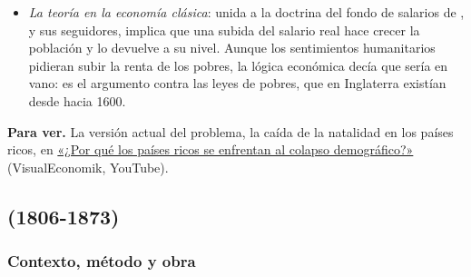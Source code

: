 \documentclass[11pt]{article}
\begin{document}
\begin{anotaciones}
\begin{itemize}
\begin{itemize}
  \item El método pasa de ser casi solo deductivo a ser también inductivo, con datos estadísticos.
  \item Cambian las conclusiones: entra la contención moral, un freno que debilita su argumento contra los utópicos, aunque ya no se preocupa de refutarlos. Desde entonces el \emph{Ensayo} apenas cambia en las ediciones siguientes.
  \end{itemize}
\item \emph{La teoría en la economía clásica}: unida a la doctrina del fondo de salarios de ,  y sus seguidores, implica que una subida del salario real hace crecer la población y lo devuelve a su nivel. Aunque los sentimientos humanitarios pidieran subir la renta de los pobres, la lógica económica decía que sería en vano: es el argumento contra las leyes de pobres, que en Inglaterra existían desde hacia 1600.
\end{itemize}
\textbf{Para ver.} La versión actual del problema, la caída de la natalidad en los países ricos, en \href{https://youtu.be/yTVVOaBQxUk}{«¿Por qué los países ricos se enfrentan al colapso demográfico?»} (VisualEconomik, YouTube).
\end{anotaciones}

\subsection{ (1806-1873)}\label{sec:mill}

\subsubsection{Contexto, método y obra}\label{sec:mill-contexto}
\end{document}
